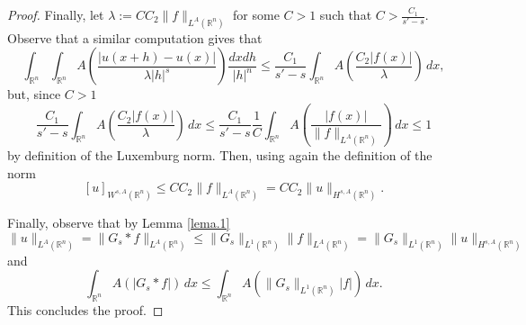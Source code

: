 \documentclass[10pt,a4paper]{amsart}
\newcommand{\R}{\mathbb R}
\begin{document}
\begin{proof}
  
Finally, let $\lambda := C C_2\|f\|_{L^A(\R^n)}$ for some $C>1$ such that $C>\frac{C_1}{s'-s}$. Observe that a similar computation gives that
$$
\int_{\R^n}\int_{\R^n} A\left(\frac{|u(x+h)-u(x)|}{\lambda |h|^s}\right)\frac{dxdh}{|h|^n}
\leq  \frac{C_1}{s'-s} \int_{\R^n} A\left(\frac{C_2|f(x)|}{\lambda}\right)\,dx,
$$
but, since $C>1$
$$
\frac{C_1}{s'-s} \int_{\R^n} A\left(\frac{C_2|f(x)|}{\lambda}\right)\,dx 
\leq 
\frac{C_1}{s'-s} \frac{1}{C}\int_{\R^n} A\left(\frac{|f(x)|}{ \|f\|_{L^A(\R^n)}}\right)\,dx\leq 1
$$
by definition of the Luxemburg norm. Then, using again the definition of the norm
$$
[u]_{W^{s,A}(\R^n)} \leq CC_2 \|f\|_{L^A(\R^n)}= CC_2 \|u\|_{H^{s,A}(\R^n)}.
$$

Finally, observe that by Lemma \ref{lema.1}
$$
\|u\|_{L^A(\R^n)}=\|G_s* f\|_{L^A(\R^n)}\leq  \|G_s\|_{L^1(\R^n)}\|f\|_{L^A(\R^n)} = \|G_s\|_{L^1(\R^n)}\|u\|_{H^{s,A}(\R^n)}
$$
and
$$
\int_{\R^n} A(|G_s*f|)\,dx \leq \int_{\R^n} A(\|G_s\|_{L^1(\R^n)}|f|)\,dx.
$$
This concludes the proof.
\end{proof}
\end{document}
